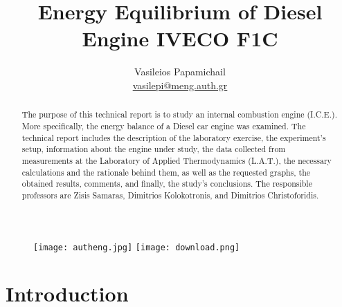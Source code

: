 \documentclass{report}
\title{%
Energy Equilibrium of Diesel Engine IVECO F1C}
\author{%
Vasileios Papamichail \\ \href{mailto:vasilepi@meng.auth.gr}{\selectlanguage{english}vasilepi@meng.auth.gr}\selectlanguage{greek}}
\begin{document}
\begin{figure}
\texttt{[image: autheng.jpg]}
\hspace{-50mm}
\texttt{[image: download.png]}
\end{figure}

\maketitle
\newpage


\begin{abstract}

The purpose of this technical report is to study an internal combustion engine (I.C.E.). More specifically, the energy balance of a Diesel car engine was examined. The technical report includes the description of the laboratory exercise, the experiment's setup, information about the engine under study, the data collected from measurements at the Laboratory of Applied Thermodynamics (L.A.T.), the necessary calculations and the rationale behind them, as well as the requested graphs, the obtained results, comments, and finally, the study's conclusions. The responsible professors are Zisis Samaras, Dimitrios Kolokotronis, and Dimitrios Christoforidis.




\end{abstract}
\newpage

\tableofcontents
\newpage




\chapter{%
Introduction}
\end{document}
